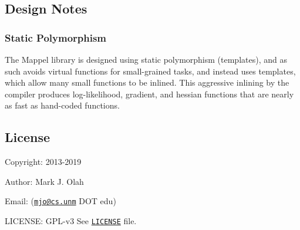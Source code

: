 \subsection*{Design Notes}

\subsubsection*{Static Polymorphism}

The Mappel library is designed using static polymorphism (templates), and as such avoids virtual functions for small-\/grained tasks, and instead uses templates, which allow many small functions to be inlined. This aggressive inlining by the compiler produces log-\/likelihood, gradient, and hessian functions that are nearly as fast as hand-\/coded functions.

\subsection*{License}


\begin{DoxyItemize}
\item Copyright\+: 2013-\/2019
\item Author\+: Mark J. Olah
\item Email\+: (\href{mailto:mjo@cs.unm}{\tt mjo@cs.\+unm} D\+OT edu)
\item L\+I\+C\+E\+N\+SE\+: G\+P\+L-\/v3 See \href{https://github.com/markjolah/Mappel/blob/master/LICENSE}{\tt L\+I\+C\+E\+N\+SE} file. 
\end{DoxyItemize}
